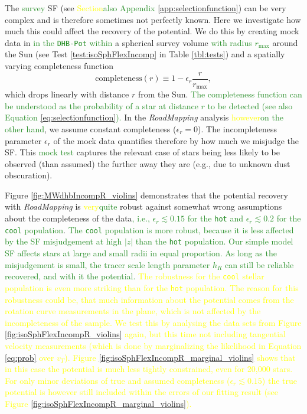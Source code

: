 \documentclass[iop,revtex4,numberedappendix,appendixfloats]{emulateapj}
\newcommand{\RM}{{\sl RoadMapping}}
\newcommand{\NEW}[1]{\textcolor{ForestGreen}{#1}}
\newcommand{\OLD}[1]{\textcolor{Yellow}{#1}}%
\begin{document}
The \NEW{survey} SF (see \OLD{Section}\NEW{also Appendix} \ref{app:selectionfunction}) can be very complex and is therefore sometimes not perfectly known. Here we investigate how much this could affect the recovery of the potential. We do this by creating mock data in \NEW{in the \texttt{DHB-Pot} within} a spherical survey volume \NEW{with radius $r_\text{max}$} around the Sun (see Test \ref{test:isoSphFlexIncomp} in Table \ref{tbl:tests}) and a spatially varying completeness function
\begin{equation}
\text{completeness}(r) \equiv 1- \epsilon_r \frac{r}{r_\text{max}}, \label{eq:rad_incomp}
\end{equation}
which drops linearly with distance $r$ from the Sun. \NEW{The completeness function can be understood as the probability of a star at distance $r$ to be detected (see also  Equation \ref{eq:selectionfunction}).} In the \RM{} analysis \OLD{however}\NEW{on the other hand}, we assume constant completeness ($\epsilon_r=0$). The incompleteness parameter $\epsilon_r$ of the mock data quantifies therefore by how much we misjudge the SF. This \NEW{mock test} captures the relevant case of stars being less likely to be observed (than assumed) the further away they are (e.g., due to unknown dust obscuration). 

Figure \ref{fig:MWdhbIncompR_violins} demonstrates that the potential recovery with \RM{} is \OLD{very}\NEW{quite} robust against somewhat wrong assumptions about the completeness of the data\NEW{, i.e., $\epsilon_r \lesssim 0.15$ for the \texttt{hot} and $\epsilon_r \lesssim 0.2$ for the \texttt{cool} population}. \NEW{The \texttt{cool} population is more robust, because it is less affected by the SF misjudgement at high $|z|$ than the \texttt{hot} population. Our simple model SF affects stars at large and small radii in equal proportion. As long as the misjudgement is small, the tracer scale length parameter $h_R$ can still be reliable recovered, and with it the potential.} \OLD{The robustness for the \texttt{cool} stellar population is even more striking than for the \texttt{hot} population. The reason for this robustness could be, that much information about the potential comes from the rotation curve measurements in the plane, which is not affected by the incompleteness of the sample. We test this by analysing the data sets from Figure \ref{fig:isoSphFlexIncompR_violins} again, but this time not including tangential velocity measurements (which is done by marginalizing the likelihood in Equation \eqref{eq:prob} over $v_T$). Figure \ref{fig:isoSphFlexIncompR_marginal_violins} shows that in this case the potential is much less tightly constrained, even for 20,000 stars. For only minor deviations of true and assumed completeness ($\epsilon_r \lesssim 0.15$) the true potential is however still included within the errors of our fitting result (see Figure \ref{fig:isoSphFlexIncompR_marginal_violins}).}
\end{document}
